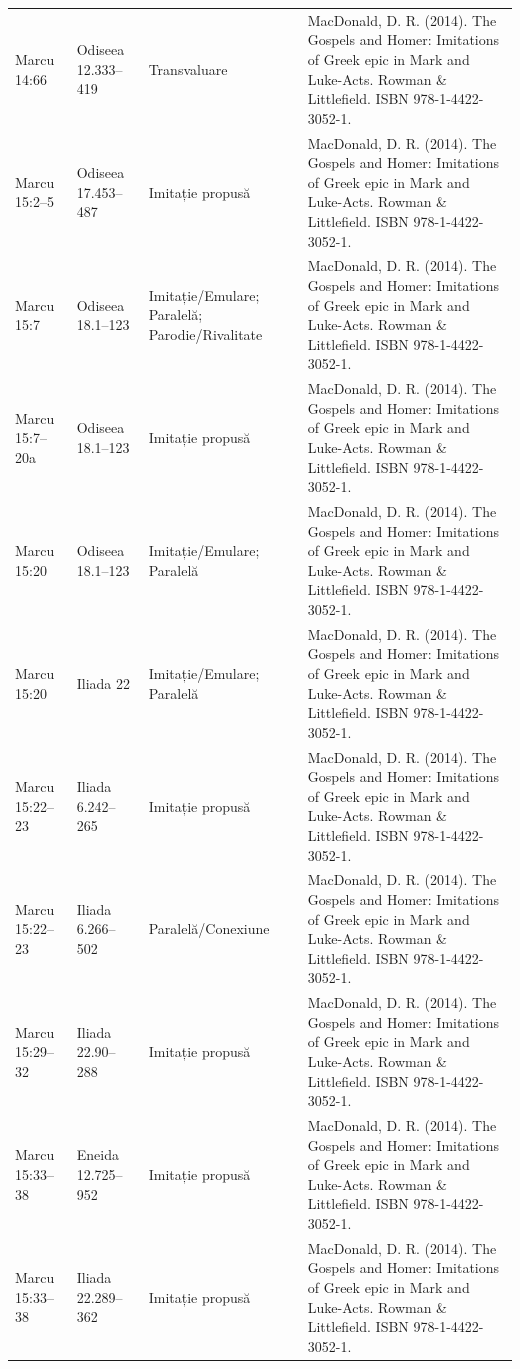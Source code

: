 \documentclass[12pt,a4paper,twoside,openany]{book}
\begin{document}
\begin{longtable}{L{1.4cm}L{1.7cm}L{3.1cm}L{8.4cm}}
Marcu 14:66 & Odiseea 12.333–419 & Transvaluare & MacDonald, D. R. (2014). The Gospels and Homer: Imitations of Greek epic in Mark and Luke-Acts. Rowman \& Littlefield. ISBN 978-1-4422-3052-1. \\
Marcu 15:2–5 & Odiseea 17.453–487 & Imitație propusă & MacDonald, D. R. (2014). The Gospels and Homer: Imitations of Greek epic in Mark and Luke-Acts. Rowman \& Littlefield. ISBN 978-1-4422-3052-1. \\
Marcu 15:7 & Odiseea 18.1–123 & Imitație/Emulare; Paralelă; Parodie/Rivalitate & MacDonald, D. R. (2014). The Gospels and Homer: Imitations of Greek epic in Mark and Luke-Acts. Rowman \& Littlefield. ISBN 978-1-4422-3052-1. \\
Marcu 15:7–20a & Odiseea 18.1–123 & Imitație propusă & MacDonald, D. R. (2014). The Gospels and Homer: Imitations of Greek epic in Mark and Luke-Acts. Rowman \& Littlefield. ISBN 978-1-4422-3052-1. \\
Marcu 15:20 & Odiseea 18.1–123 & Imitație/Emulare; Paralelă & MacDonald, D. R. (2014). The Gospels and Homer: Imitations of Greek epic in Mark and Luke-Acts. Rowman \& Littlefield. ISBN 978-1-4422-3052-1. \\
Marcu 15:20 & Iliada 22 & Imitație/Emulare; Paralelă & MacDonald, D. R. (2014). The Gospels and Homer: Imitations of Greek epic in Mark and Luke-Acts. Rowman \& Littlefield. ISBN 978-1-4422-3052-1. \\
Marcu 15:22–23 & Iliada 6.242–265 & Imitație propusă & MacDonald, D. R. (2014). The Gospels and Homer: Imitations of Greek epic in Mark and Luke-Acts. Rowman \& Littlefield. ISBN 978-1-4422-3052-1. \\
Marcu 15:22–23 & Iliada 6.266–502 & Paralelă/Conexiune & MacDonald, D. R. (2014). The Gospels and Homer: Imitations of Greek epic in Mark and Luke-Acts. Rowman \& Littlefield. ISBN 978-1-4422-3052-1. \\
Marcu 15:29–32 & Iliada 22.90–288 & Imitație propusă & MacDonald, D. R. (2014). The Gospels and Homer: Imitations of Greek epic in Mark and Luke-Acts. Rowman \& Littlefield. ISBN 978-1-4422-3052-1. \\
Marcu 15:33–38 & Eneida 12.725–952 & Imitație propusă & MacDonald, D. R. (2014). The Gospels and Homer: Imitations of Greek epic in Mark and Luke-Acts. Rowman \& Littlefield. ISBN 978-1-4422-3052-1. \\
Marcu 15:33–38 & Iliada 22.289–362 & Imitație propusă & MacDonald, D. R. (2014). The Gospels and Homer: Imitations of Greek epic in Mark and Luke-Acts. Rowman \& Littlefield. ISBN 978-1-4422-3052-1. \\

\end{longtable}
\end{document}
